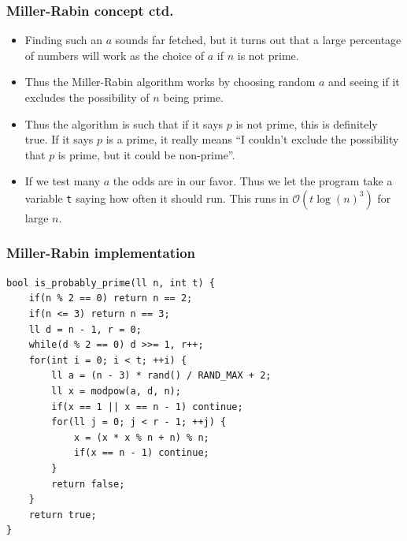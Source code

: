 \documentclass{beamer}
\begin{document}
\begin{frame}[plain]
\frametitle{Miller-Rabin concept ctd.}

\begin{itemize}

    \item Finding such an $a$ sounds far fetched, but it turns out that a large percentage of numbers will work as the choice of $a$ if $n$ is not prime.
    \item Thus the Miller-Rabin algorithm works by choosing random $a$ and seeing if it excludes the possibility of $n$ being prime.

    \item Thus the algorithm is such that if it says $p$ is not prime, this is definitely true. If it says $p$ is a prime, it really means ``I couldn't exclude the possibility that $p$ is prime, but it could be non-prime''. 

    \item If we test many $a$ the odds are in our favor. Thus we let the program take a variable \texttt{t} saying how often it should run. This runs in $\mathcal{O}(t\log(n)^3)$ for large $n$.

\end{itemize}

\end{frame}

\begin{frame}
\frametitle{Miller-Rabin implementation}

\begin{small}
\begin{verbatim}
bool is_probably_prime(ll n, int t) {
    if(n % 2 == 0) return n == 2;
    if(n <= 3) return n == 3;
    ll d = n - 1, r = 0;
    while(d % 2 == 0) d >>= 1, r++;
    for(int i = 0; i < t; ++i) {
        ll a = (n - 3) * rand() / RAND_MAX + 2;
        ll x = modpow(a, d, n);
        if(x == 1 || x == n - 1) continue;
        for(ll j = 0; j < r - 1; ++j) {
            x = (x * x % n + n) % n;
            if(x == n - 1) continue;
        }
        return false;
    }
    return true;
}
\end{verbatim}
\end{small}

\end{frame}
\end{document}
